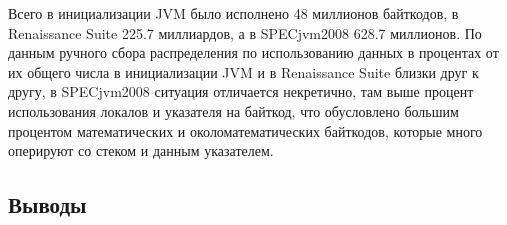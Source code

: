 Всего в инициализации JVM было исполнено 48 миллионов байткодов, в Renaissance Suite 225.7 миллиардов, а в SPECjvm2008 628.7 миллионов. По данным ручного сбора распределения по использованию данных в процентах от их общего числа в инициализации JVM и в Renaissance Suite близки друг к другу, в SPECjvm2008 ситуация отличается некретично, там выше процент использования локалов и указателя на байткод, что обусловлено большим процентом математических и околоматематических байткодов, которые много оперируют со стеком и данным указателем.





\subsection{Выводы}
